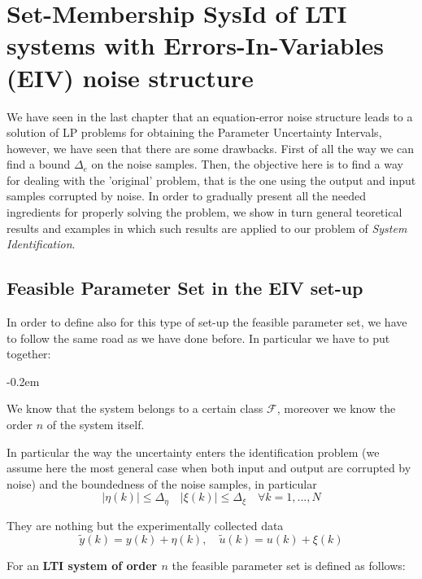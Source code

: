 \chapter[SM SysId of LTI systems with EIV noise structure]{Set-Membership SysId of LTI systems with Errors-In-Variables (EIV) noise structure}

We have seen in the last chapter that an equation-error noise structure leads to a solution of LP problems for obtaining the Parameter Uncertainty Intervals, however, we have seen that there are some drawbacks. 
First of all the way we can find a bound $\Delta_e$ on the noise samples.
Then, the objective here is to find a way for dealing with the 'original' problem, that is the one using the output and input samples corrupted by noise. In order to gradually present all the needed ingredients for properly solving the problem, we show in turn general teoretical results and examples in which such results are applied to our problem of \textit{System Identification}.

\section{ Feasible Parameter Set in the EIV set-up}
In order to define also for this type of set-up the feasible parameter set, we have to follow the same road as we have done before. In particular we have to put together:
\begin{description}
    \itemsep-0.2em
    \item[A-priori information on the system] We know that the system belongs to a certain class $\mathcal{F}$, moreover we know the order $n$ of the system itself.
    \item[A-priori information on the noise] In particular the way the uncertainty enters the identification problem (we assume here the most general case when both input and output are corrupted by noise) and the boundedness of the noise samples, in particular
    \begin{equation}
        \vert \eta(k) \vert \le \Delta_\eta \quad
        \vert \xi(k) \vert \le \Delta_\xi
        \quad
        \forall k=1,...,N
    \end{equation}
    \item[A-posteriori information] They are nothing but the experimentally collected data $$\tilde{y}(k)=y(k)+\eta(k), \quad 
    \tilde{u}(k)=u(k)+\xi(k) $$
\end{description}
For an \textbf{LTI system of order $n$} the feasible parameter set is defined as follows: 

